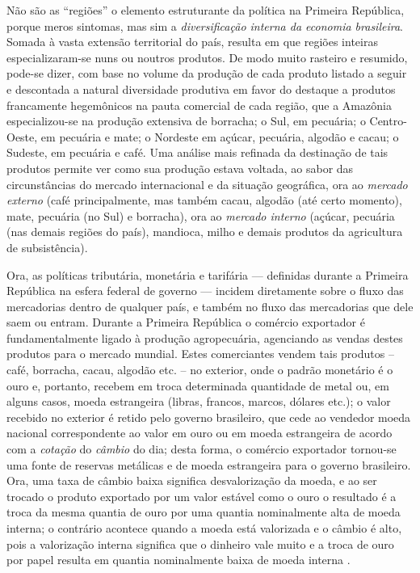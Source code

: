 Não são as ``regiões'' o elemento estruturante da política na Primeira República, porque meros sintomas, mas sim a \textit{diversificação interna da economia brasileira}. Somada à vasta extensão territorial do país, resulta em que regiões inteiras especializaram-se nuns ou noutros produtos. De modo muito rasteiro e resumido, pode-se dizer, com base no volume da produção de cada produto listado a seguir e descontada a natural diversidade produtiva em favor do destaque a produtos francamente hegemônicos na pauta comercial de cada região, que a Amazônia especializou-se na produção extensiva de borracha; o Sul, em pecuária; o Centro-Oeste, em pecuária e mate; o Nordeste em açúcar, pecuária, algodão e cacau; o Sudeste, em pecuária e café. Uma análise mais refinada da destinação de tais produtos permite ver como sua produção estava voltada, ao sabor das circunstâncias do mercado internacional e da situação geográfica, ora ao \textit{mercado externo} (café principalmente, mas também cacau, algodão (até certo momento), mate, pecuária (no Sul) e borracha), ora ao \textit{mercado interno} (açúcar, pecuária (nas demais regiões do país), mandioca, milho e demais produtos da agricultura de subsistência). 

Ora, as políticas tributária, monetária e tarifária --- definidas durante a Primeira República na esfera federal de governo --- incidem diretamente sobre o fluxo das mercadorias dentro de qualquer país, e também no fluxo das mercadorias que dele saem ou entram. Durante a Primeira República o comércio exportador é fundamentalmente ligado à produção agropecuária, agenciando as vendas destes produtos para o mercado mundial. Estes comerciantes vendem tais produtos -- café, borracha, cacau, algodão etc. -- no exterior, onde o padrão monetário é o ouro e, portanto, recebem em troca determinada quantidade de metal ou, em alguns casos, moeda estrangeira (libras, francos, marcos, dólares etc.); o valor recebido no exterior é retido pelo governo brasileiro, que cede ao vendedor moeda nacional correspondente ao valor em ouro ou em moeda estrangeira de acordo com a \textit{cotação} do \textit{câmbio} do dia; desta forma, o comércio exportador tornou-se uma fonte de reservas metálicas e de moeda estrangeira para o governo brasileiro. Ora, uma taxa de câmbio baixa significa desvalorização da moeda, e ao ser trocado o produto exportado por um valor estável como o ouro o resultado é a troca da mesma quantia de ouro por uma quantia nominalmente alta de moeda interna; o contrário acontece quando a moeda está valorizada e o câmbio é alto, pois a valorização interna significa que o dinheiro vale muito e a troca de ouro por papel resulta em quantia nominalmente baixa de moeda interna \cite[p.~99]{CARONE1970inst}. 

